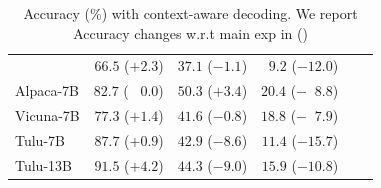 \documentclass{beamer}
\begin{document}
\begin{frame}
\begin{columns}[t]
\begin{table}[t]
{\begin{tabular}{lrrrrr}
               & \cellcolor{'sgreen'} $66.5$ ($+2.3$)  & \cellcolor{'sred'} $37.1$ ($-1.1$)    & \cellcolor{'sred'}$9.2$ ($-12.0$)    \\
            \multirow{1}{*}{Alpaca-7B}           
               &  $82.7$ ($\;\;\;0.0$)  & \cellcolor{'sgreen'} $50.3$ ($+3.4$)    & \cellcolor{'sred'} $20.4$ ($-\;\;8.8$)    \\
            \multirow{1}{*}{Vicuna-7B}            
               & \cellcolor{'sgreen'} $77.3$ ($+1.4$)   & \cellcolor{'sred'} $41.6$ ($-0.8$)    & \cellcolor{'sred'} $18.8$ ($-\;\;7.9$)       \\
            \multirow{1}{*}{Tulu-7B}             
               & \cellcolor{'sgreen'} $87.7$ ($+0.9$)  & \cellcolor{'sred'} $42.9$ ($-8.6$)     & \cellcolor{'sred'} $11.4$ ($-15.7$)   \\ 
            
            \multirow{1}{*}{Tulu-13B}
               & \cellcolor{'sgreen'} $91.5$ ($+4.2$)  & \cellcolor{'sred'} $44.3$ ($-9.0$)     & \cellcolor{'sred'} $15.9$ ($-10.8$)   \\
                                       \bottomrule
            \end{tabular}
            }
            \caption{
            \footnotesize Accuracy (\%) with context-aware decoding.
            We report Accuracy changes w.r.t main exp in ()
            }
            \label{tab:cad}
            \end{table}
            
    \end{columns}
\end{frame}


\backmatter
{}


\end{document}
